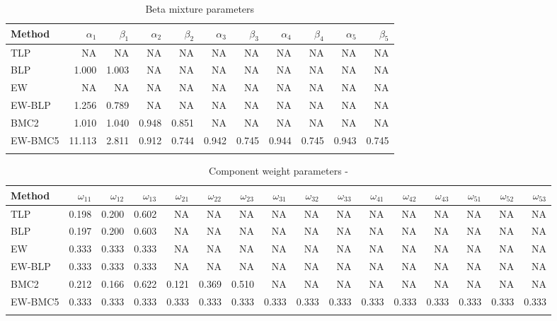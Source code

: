 \documentclass[
]{article}
\begin{document}
\begin{table}[H]

\caption{\label{tab:unnamed-chunk-11}Beta mixture parameters}
\centering
\fontsize{8}{10}\selectfont
\begin{tabular}[t]{lrrrrrrrrrr}
\toprule{}
Method & $\alpha_1$ & $\beta_1$ & $\alpha_2$ & $\beta_2$ & $\alpha_3$ & $\beta_3$ & $\alpha_4$ & $\beta_4$ & $\alpha_5$ & $\beta_5$\\
\midrule{}
TLP & NA & NA & NA & NA & NA & NA & NA & NA & NA & NA\\
BLP & 1.000 & 1.003 & NA & NA & NA & NA & NA & NA & NA & NA\\
EW & NA & NA & NA & NA & NA & NA & NA & NA & NA & NA\\
EW-BLP & 1.256 & 0.789 & NA & NA & NA & NA & NA & NA & NA & NA\\
BMC2 & 1.010 & 1.040 & 0.948 & 0.851 & NA & NA & NA & NA & NA & NA\\
\addlinespace
EW-BMC5 & 11.113 & 2.811 & 0.912 & 0.744 & 0.942 & 0.745 & 0.944 & 0.745 & 0.943 & 0.745\\
\bottomrule{}
\end{tabular}
\end{table}

\begin{table}[H]

\caption{\label{tab:unnamed-chunk-11}Component weight parameters -}
\centering
\fontsize{8}{10}\selectfont
\begin{tabular}[t]{lrrrrrrrrrrrrrrr}
\toprule{}
Method & $\omega_{11}$ & $\omega_{12}$ & $\omega_{13}$ & $\omega_{21}$ & $\omega_{22}$ & $\omega_{23}$ & $\omega_{31}$ & $\omega_{32}$ & $\omega_{33}$ & $\omega_{41}$ & $\omega_{42}$ & $\omega_{43}$ & $\omega_{51}$ & $\omega_{52}$ & $\omega_{53}$\\
\midrule{}
TLP & 0.198 & 0.200 & 0.602 & NA & NA & NA & NA & NA & NA & NA & NA & NA & NA & NA & NA\\
BLP & 0.197 & 0.200 & 0.603 & NA & NA & NA & NA & NA & NA & NA & NA & NA & NA & NA & NA\\
EW & 0.333 & 0.333 & 0.333 & NA & NA & NA & NA & NA & NA & NA & NA & NA & NA & NA & NA\\
EW-BLP & 0.333 & 0.333 & 0.333 & NA & NA & NA & NA & NA & NA & NA & NA & NA & NA & NA & NA\\
BMC2 & 0.212 & 0.166 & 0.622 & 0.121 & 0.369 & 0.510 & NA & NA & NA & NA & NA & NA & NA & NA & NA\\
\addlinespace
EW-BMC5 & 0.333 & 0.333 & 0.333 & 0.333 & 0.333 & 0.333 & 0.333 & 0.333 & 0.333 & 0.333 & 0.333 & 0.333 & 0.333 & 0.333 & 0.333\\
\bottomrule{}
\end{tabular}
\end{table}
\end{document}
